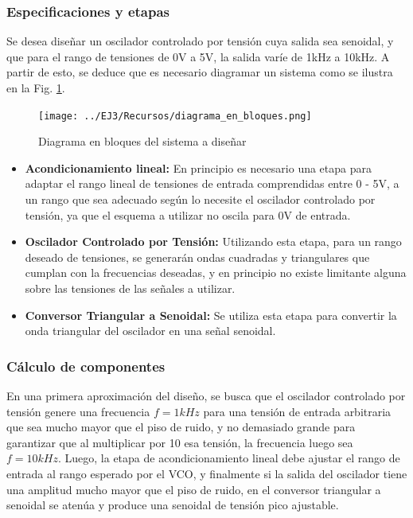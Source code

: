 \subsubsection{Especificaciones y etapas}
Se desea dise\~nar un oscilador controlado por tensi\'on cuya salida sea senoidal, y que para el rango de tensiones de 0V a 5V, la salida
var\'ie de 1kHz a 10kHz. A partir de esto, se deduce que es necesario diagramar un sistema como se ilustra en la Fig. \ref{fig:diagrama_en_bloques}.

\begin{figure}[H]
    \centering
    \texttt{[image: ../EJ3/Recursos/diagrama\_en\_bloques.png]}
    \caption{Diagrama en bloques del sistema a dise\~nar}
    \label{fig:diagrama_en_bloques}
\end{figure}

\begin{itemize}
    \item \textbf{Acondicionamiento lineal:} En principio es necesario una etapa para adaptar el rango lineal de tensiones de entrada comprendidas entre
    0 - 5V, a un rango que sea adecuado seg\'un lo necesite el oscilador controlado por tensi\'on, ya que el esquema a utilizar no oscila para 0V de entrada.
    \item \textbf{Oscilador Controlado por Tensi\'on:} Utilizando esta etapa, para un rango deseado de tensiones, se generar\'an ondas cuadradas y triangulares
    que cumplan con la frecuencias deseadas, y en principio no existe limitante alguna sobre las tensiones de las se\~nales a utilizar.
    \item \textbf{Conversor Triangular a Senoidal:} Se utiliza esta etapa para convertir la onda triangular del oscilador en una se\~nal senoidal.
\end{itemize}

\subsubsection{C\'alculo de componentes}
En una primera aproximaci\'on del dise\~no, se busca que el oscilador controlado por tensi\'on genere una frecuencia $f = 1kHz$ para una tensi\'on de entrada
arbitraria que sea mucho mayor que el piso de ruido, y no demasiado grande para garantizar que al multiplicar por 10 esa tensi\'on, la frecuencia luego sea $f = 10kHz$.
Luego, la etapa de acondicionamiento lineal debe ajustar el rango de entrada al rango esperado por el VCO, y finalmente si la salida del oscilador tiene una amplitud mucho mayor
que el piso de ruido, en el conversor triangular a senoidal se aten\'ua y produce una senoidal de tensi\'on pico ajustable.

